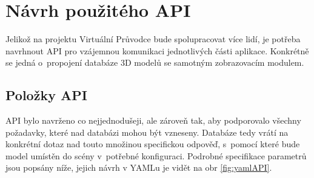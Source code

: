 \documentclass[thesis=B,czech]{FITthesis}[2012/06/26]
\begin{document}
	\section{Návrh použitého API}
	\label{sec:API}
    
    Jelikož na projektu Virtuální Průvodce bude spolupracovat více lidí, je potřeba navrhnout API pro vzájemnou komunikaci jednotlivých části aplikace. Konkrétně se jedná o~propojení databáze 3D modelů se samotným zobrazovacím modulem.

    
      \subsection{Položky API}
      
      API bylo navrženo co nejjednodušeji, ale zároveň tak, aby  podporovalo všechny požadavky, které nad databázi mohou být vzneseny. Databáze tedy vrátí na konkrétní dotaz nad touto množinou specifickou odpověď, s~pomocí které bude model umístěn do scény v~potřebné konfiguraci. Podrobné specifikace parametrů jsou popsány níže, jejich návrh v YAMLu je vidět na obr \ref{fig:yamlAPI}.
	
\end{document}

